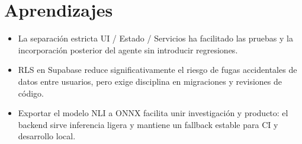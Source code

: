 \section{Aprendizajes}

\begin{itemize}[leftmargin=*,itemsep=0.2em]
  \item La separación estricta UI / Estado / Servicios ha facilitado
        las pruebas y la incorporación posterior del agente sin
        introducir regresiones.
  \item RLS en Supabase reduce significativamente el riesgo de fugas
        accidentales de datos entre usuarios, pero exige disciplina
        en migraciones y revisiones de código.
  \item Exportar el modelo NLI a ONNX facilita unir investigación y
        producto: el backend sirve inferencia ligera y mantiene un
        fallback estable para CI y desarrollo local.
\end{itemize}
